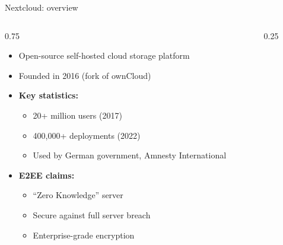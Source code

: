 \ifdefined\PRESENTATION\else\PassOptionsToClass{handout}{beamer}\fi\documentclass[aspectratio=169, lualatex]{beamer}
\begin{document}
\begin{frame}{Nextcloud: overview}
	\begin{columns}[c]
		\begin{column}{0.75\textwidth}
			\begin{itemize}
				\item Open-source self-hosted cloud storage platform
				\item Founded in 2016 (fork of ownCloud)
				\item \textbf{Key statistics:}
				      \begin{itemize}
					      \item 20+ million users (2017)
					      \item 400,000+ deployments (2022)
					      \item Used by German government, Amnesty International
				      \end{itemize}
				\item \textbf{E2EE claims:}
				      \begin{itemize}
					      \item ``Zero Knowledge'' server
					      \item Secure against full server breach
					      \item Enterprise-grade encryption
				      \end{itemize}
			\end{itemize}
		\end{column}
		\begin{column}{0.25\textwidth}
		\end{column}
	\end{columns}
\end{frame}
\end{document}

